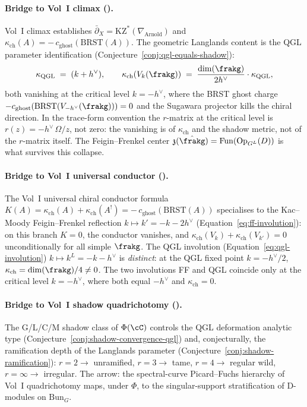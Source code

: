 \paragraph{Bridge to Vol~I climax (\cite{VolI}).}
Vol~I climax establishes $\bar\partial_X = \mathrm{KZ}^*(\nabla_{\mathrm{Arnold}})$ and $\kappa_{\mathrm{ch}}(A) = -\,c_{\mathrm{ghost}}(\mathrm{BRST}(A))$. The geometric Langlands content is the QGL parameter identification \textup{(}Conjecture~\ref{conj:qgl-equals-shadow}\textup{):}
\[
 \kappa_{\mathrm{QGL}} \;=\; (k + h^\vee), \qquad
 \kappa_{\mathrm{ch}}(V_k(\frakg)) \;=\; \frac{\dim(\frakg)}{2 h^\vee} \cdot \kappa_{\mathrm{QGL}},
\]
both vanishing at the critical level $k = -h^\vee$, where the BRST ghost charge $-c_{\mathrm{ghost}}(\mathrm{BRST}(V_{-h^\vee}(\frakg))) = 0$ and the Sugawara projector kills the chiral direction. In the trace-form convention the $r$-matrix at the critical level is $r(z) = -h^\vee\,\Omega/z$, not zero: the vanishing is of $\kappa_{\mathrm{ch}}$ and the shadow metric, not of the $r$-matrix itself. The Feigin--Frenkel center $\mathfrak{z}(\hat\frakg) = \mathrm{Fun}(\mathrm{Op}_{G^L}(D))$ is what survives this collapse.

\paragraph{Bridge to Vol~I universal conductor (\cite{VolI}).}
The Vol~I universal chiral conductor formula $K(A) = \kappa_{\mathrm{ch}}(A) + \kappa_{\mathrm{ch}}(A^!) = -\,c_{\mathrm{ghost}}(\mathrm{BRST}(A))$ specialises to the Kac--Moody Feigin--Frenkel reflection $k \mapsto k' = -k - 2 h^\vee$ \textup{(}Equation~\eqref{eq:ff-involution}\textup{):} on this branch $K = 0$, the conductor vanishes, and $\kappa_{\mathrm{ch}}(V_k) + \kappa_{\mathrm{ch}}(V_{k'}) = 0$ unconditionally for all simple $\frakg$. The QGL involution \textup{(}Equation~\eqref{eq:qgl-involution}\textup{)} $k \mapsto k^L = -k - h^\vee$ is \emph{distinct}: at the QGL fixed point $k = -h^\vee/2$, $\kappa_{\mathrm{ch}} = \dim(\frakg)/4 \neq 0$. The two involutions FF and QGL coincide only at the critical level $k = -h^\vee$, where both equal $-h^\vee$ and $\kappa_{\mathrm{ch}} = 0$.

\paragraph{Bridge to Vol~I shadow quadrichotomy (\cite{VolI}).}
The G/L/C/M shadow class of $\Phi(\cC)$ controls the QGL deformation analytic type \textup{(}Conjecture~\ref{conj:shadow-convergence-qgl}\textup{)} and, conjecturally, the ramification depth of the Langlands parameter \textup{(}Conjecture~\ref{conj:shadow-ramification}\textup{):} $r = 2 \to$ unramified, $r = 3 \to$ tame, $r = 4 \to$ regular wild, $r = \infty \to$ irregular. The arrow: the spectral-curve Picard--Fuchs hierarchy of Vol~I quadrichotomy maps, under $\Phi$, to the singular-support stratification of D-modules on $\mathrm{Bun}_G$.

